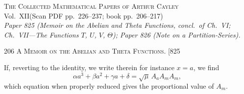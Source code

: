 \documentclass[11pt]{article}
\begin{document}
\begin{center}
{\large\scshape The Collected Mathematical Papers of Arthur Cayley}\\[0.3em]
{\large Vol.\ XII\quad (Scan PDF pp.\ 226--237; book pp.\ 206--217)}\\[0.4em]
{\itshape Paper 825 (Memoir on the Abelian and Theta Functions, concl.\ of Ch.\ VI;
Ch.\ VII---The Functions $T$, $U$, $V$, $\Theta$); Paper 826 (Note on a Partition-Series).}
\end{center}
\vspace{0.6em}


\noindent\textsc{206 \hfill A Memoir on the Abelian and Theta Functions. \hfill [825}
\vspace{0.6em}

\noindent
If, reverting to the identity, we write therein for instance $x=a$, we find
\[
   \alpha a^{3}+\beta a^{2}+\gamma a+\delta = \sqrt{\mu}\,A_{a}A_{m}A_{m},
\]
which equation when properly reduced gives the proportional value of $A_{m}$.
\end{document}
